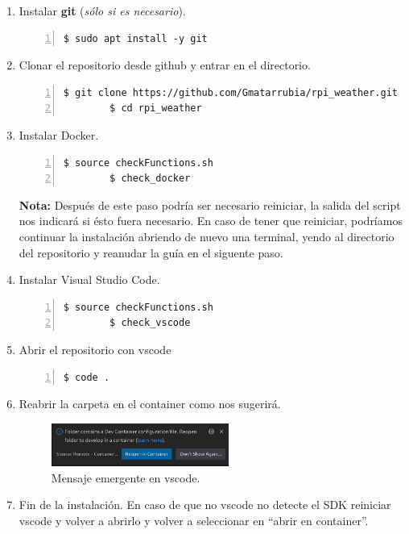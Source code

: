 \begin{enumerate}
    \item Instalar \textbf{\gls{git}} (\emph{sólo si es necesario}).
    \begin{lstlisting}[style=consola, numbers=left]
        $ sudo apt install -y git
    \end{lstlisting}

    \item Clonar el repositorio desde github y entrar en el directorio.
    \begin{lstlisting}[style=consola, numbers=left]
        $ git clone https://github.com/Gmatarrubia/rpi_weather.git
        $ cd rpi_weather
    \end{lstlisting}

    \item Instalar Docker.
    \begin{lstlisting}[style=consola, numbers=left]
        $ source checkFunctions.sh
        $ check_docker
    \end{lstlisting}
    \textbf{Nota:} Después de este paso podría ser necesario reiniciar, la salida del
    script nos indicará si ésto fuera necesario. En caso de tener que reiniciar,
    podríamos continuar la instalación abriendo de nuevo una terminal, yendo al directorio
    del repositorio y reanudar la guía en el siguente paso.

    \item Instalar Visual Studio Code.
    \begin{lstlisting}[style=consola, numbers=left]
        $ source checkFunctions.sh
        $ check_vscode
    \end{lstlisting}

    \item Abrir el repositorio con \gls{vscode}
    \begin{lstlisting}[style=consola, numbers=left]
        $ code .
    \end{lstlisting}

    \item Reabrir la carpeta en el container como nos sugerirá.
    \begin{figure}[H]
        \centering
        \includegraphics[width=0.55\textwidth]{imgs/dev-container}
        \caption[Mensaje emergente en vscode]{Mensaje emergente en vscode.}
        \label{imgs:vscode-devcontainer}
    \end{figure}

    \item Fin de la instalación. En caso de que no \gls{vscode} no detecte el \gls{SDK}
    reiniciar \gls{vscode} y volver a abrirlo y volver a seleccionar en ``abrir en container''.
\end{enumerate}

